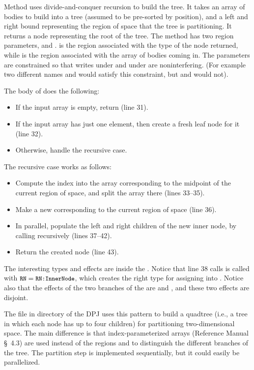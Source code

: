 Method  uses divide-and-conquer recursion to build the
tree.  It takes an array of bodies to build into a tree (assumed to be
pre-sorted by position), and a left and right bound representing the
region of space that the tree is partitioning.  It returns a node
representing the root of the tree.  The method has two region
parameters,  and .   is the region associated
with the type of the node returned, while  is the region
associated with the array of bodies coming in.  The parameters are
constrained so that writes under  and under  are
noninterfering.  (For example two different names  and 
would satisfy this constraint, but  and  would not).

The body of  does the following:
%
\begin{itemize}
%
\item If the input array is empty, return  (line 31).
%
\item If the input array has just one element, then create a fresh
  leaf node for it (line 32).
%
\item Otherwise, handle the recursive case.
%
\end{itemize}

The recursive case works as follows:
%
\begin{itemize}
%
\item Compute the index into the array corresponding to the midpoint
  of the current region of space, and split the array there (lines
  33--35).
%
\item Make a new  corresponding to the current region
  of space (line 36).
%
\item In parallel, populate the left and right children of the new
  inner node, by calling  recursively (lines 37--42).
%
\item Return the created node (line 43).
%
\end{itemize}

The interesting types and effects are inside the .
Notice that line 38 calls  is called with
$\mbox{\small{\texttt{RN}}}=\mbox{\small{\texttt{RN:InnerNode}}}$, which creates the right type for
assigning into .  Notice also that the effects of
the two branches of the  are  and , and these two effects are disjoint.

 The file  in directory
 of the DPJ uses this pattern to build a
quadtree (i.e., a tree in which each node has up to four children) for
partitioning two-dimensional space.  The main difference is that
index-parameterized arrays (Reference Manual \S~4.3) are used instead
of the regions  and  to distinguish the
different branches of the tree.  The partition step is implemented
sequentially, but it could easily be parallelized.

